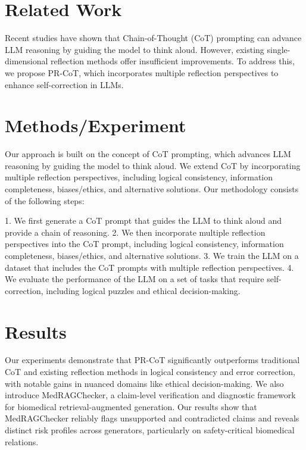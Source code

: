 \documentclass{article}
\begin{document}
\section{Related Work}

Recent studies have shown that Chain-of-Thought (CoT) prompting can advance LLM reasoning by guiding the model to think aloud. However, existing single-dimensional reflection methods offer insufficient improvements. To address this, we propose PR-CoT, which incorporates multiple reflection perspectives to enhance self-correction in LLMs.

\section{Methods/Experiment}

Our approach is built on the concept of CoT prompting, which advances LLM reasoning by guiding the model to think aloud. We extend CoT by incorporating multiple reflection perspectives, including logical consistency, information completeness, biases/ethics, and alternative solutions. Our methodology consists of the following steps:

1.  We first generate a CoT prompt that guides the LLM to think aloud and provide a chain of reasoning.
2.  We then incorporate multiple reflection perspectives into the CoT prompt, including logical consistency, information completeness, biases/ethics, and alternative solutions.
3.  We train the LLM on a dataset that includes the CoT prompts with multiple reflection perspectives.
4.  We evaluate the performance of the LLM on a set of tasks that require self-correction, including logical puzzles and ethical decision-making.

\section{Results}

Our experiments demonstrate that PR-CoT significantly outperforms traditional CoT and existing reflection methods in logical consistency and error correction, with notable gains in nuanced domains like ethical decision-making. We also introduce MedRAGChecker, a claim-level verification and diagnostic framework for biomedical retrieval-augmented generation. Our results show that MedRAGChecker reliably flags unsupported and contradicted claims and reveals distinct risk profiles across generators, particularly on safety-critical biomedical relations.
\end{document}
